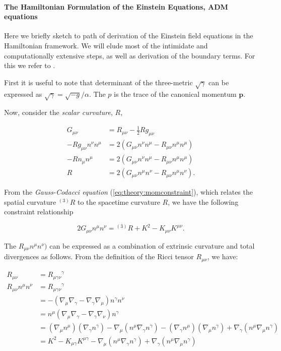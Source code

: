 \paragraph{The Hamiltonian Formulation of the Einstein Equations, ADM equations}




Here we briefly sketch to path of derivation of the Einstein field equations in the Hamiltonian framework. We will elude most of the intimidate and computationally extensive steps, as well as derivation of the boundary terms. For this we refer to \cite{Poisson:2004}.

First it is useful to note that determinant of the three-metric $\sqrt{\gamma}$ can be expressed as $\sqrt{\gamma}=\sqrt{-g}/\alpha$. 
The $p$ is the trace of the canonical momentum $\boldsymbol{p}$.

Now, consider the \textit{scalar curvature}, $R$,

\begin{align}
G_{\mu\nu} &= R_{\mu\nu} - \frac{1}{2}Rg_{\mu\nu} \\
-Rg_{\mu\nu}n^{\nu}n^{\mu} &= 2(G_{\mu\nu} n^{\nu}n^{\mu}-R_{\mu\nu}n^{\mu}n^{\mu})\\
-Rn_{\mu}n^{\mu}& = 2(G_{\mu\nu}n^{\nu}n^{\mu} - R_{\mu\nu}n^{\mu}n^{\mu}) \\
R &= 2(G_{\mu\nu}n^{\mu}n^{\nu} - R_{\mu\nu}n^{\mu}n^{\nu}).
\end{align}

From the \textit{Gauss-Codacci equation} (\ref{eq:theory:momconstraint}), which relates the spatial curvature $^{(3)}R$ to the spacetime curvature $R$, we have the following constraint relationship

\begin{equation}
2G_{\mu\nu}n^{\mu}n^{\nu} = {^{(3)}R} + K^2 - K_{\mu\nu}K^{\mu\nu}.
\end{equation}

The $R_{\mu\nu}n^{\mu}n^{\nu})$ can be expressed as a combination of extrinsic curvature and total divergences as follows.
From the definition of the Ricci tensor $R_{\mu\nu}$, we have:

\begin{align}
R_{\mu\nu} &= {R_{\mu\gamma\nu}}^{\gamma} \\
R_{\mu\nu}n^{\mu}n^{\nu} &= {R_{\mu\gamma\nu}}^{\gamma} \\
&= -(\nabla_{\mu}\nabla_{\gamma} - \nabla_{\gamma}\nabla_{\mu})n^{\gamma}n^{\nu} \\
&= n^{\mu}(\nabla_{\mu}\nabla_{\gamma} - \nabla_{\gamma}\nabla_{\nu})n^{\gamma} \\
&= (\nabla_{\mu}n^{\mu})(\nabla_{\gamma}n^{\gamma}) - \nabla_{\mu}(n^{\mu}\nabla_{\gamma}n^{\gamma}) - (\nabla_{\gamma}n^{\mu})(\nabla_{\mu}n^{\gamma}) + \nabla_{\gamma}(n^{\mu}\nabla_{\mu}n^{\gamma}) \\
&= K^2 - K_{\mu\gamma}K^{\mu\gamma} - \nabla_{\mu}(n^{\mu}\nabla_{\gamma}n^{\gamma}) + \nabla_{\gamma}(n^{\mu}\nabla_{\mu}n^{\gamma})
\end{align}


